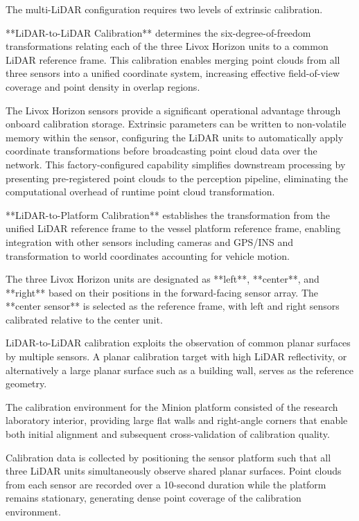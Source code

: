 
The multi-LiDAR configuration requires two levels of extrinsic calibration.

**LiDAR-to-LiDAR Calibration** determines the six-degree-of-freedom transformations relating each of the three Livox Horizon units to a common LiDAR reference frame.
This calibration enables merging point clouds from all three sensors into a unified coordinate system, increasing effective field-of-view coverage and point density in overlap regions.

The Livox Horizon sensors provide a significant operational advantage through onboard calibration storage.
Extrinsic parameters can be written to non-volatile memory within the sensor, configuring the LiDAR units to automatically apply coordinate transformations before broadcasting point cloud data over the network.
This factory-configured capability simplifies downstream processing by presenting pre-registered point clouds to the perception pipeline, eliminating the computational overhead of runtime point cloud transformation.

**LiDAR-to-Platform Calibration** establishes the transformation from the unified LiDAR reference frame to the vessel platform reference frame, enabling integration with other sensors including cameras and GPS/INS and transformation to world coordinates accounting for vehicle motion.


The three Livox Horizon units are designated as **left**, **center**, and **right** based on their positions in the forward-facing sensor array.
The **center sensor** is selected as the reference frame, with left and right sensors calibrated relative to the center unit.


LiDAR-to-LiDAR calibration exploits the observation of common planar surfaces by multiple sensors.
A planar calibration target with high LiDAR reflectivity, or alternatively a large planar surface such as a building wall, serves as the reference geometry.

The calibration environment for the Minion platform consisted of the research laboratory interior, providing large flat walls and right-angle corners that enable both initial alignment and subsequent cross-validation of calibration quality.

Calibration data is collected by positioning the sensor platform such that all three LiDAR units simultaneously observe shared planar surfaces.
Point clouds from each sensor are recorded over a 10-second duration while the platform remains stationary, generating dense point coverage of the calibration environment.

